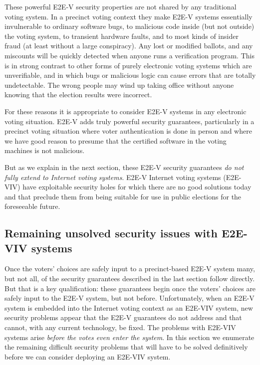 These powerful E2E-V security properties are not shared by any
traditional voting system. In a precinct voting context they make
E2E-V systems essentially invulnerable to ordinary software bugs, to
malicious code inside (but not outside) the voting system, to
transient hardware faults, and to most kinds of insider fraud (at
least without a large conspiracy). Any lost or modified ballots, and
any miscounts will be quickly detected when anyone runs a verification
program. This is in strong contrast to other forms of purely
electronic voting systems which are unverifiable, and in which bugs or
malicious logic can cause errors that are totally undetectable.  The
wrong people may wind up taking office without anyone knowing that the
election results were incorrect.

For these reasons it is appropriate to consider E2E-V systems in any
electronic voting situation. E2E-V adds truly powerful security
guarantees, particularly in a precinct voting situation where voter
authentication is done in person and where we have good reason to
presume that the certified software in the voting machines is not
malicious.

But as we explain in the next section, these E2E-V security guarantees
\emph{do not fully extend to Internet voting systems}. E2E-V Internet
voting systems (E2E-VIV) have exploitable security holes for which
there are no good solutions today and that preclude them from being
suitable for use in public elections for the foreseeable future.
  
\subsection{Remaining unsolved security issues with E2E-VIV systems}

Once the voters' choices are safely input to a precinct-based E2E-V
system many, but not all, of the security guarantees described in the
last section follow directly. But that is a key qualification: these
guarantees begin once the voters' choices are safely input to the
E2E-V system, but not before. Unfortunately, when an E2E-V system is
embedded into the Internet voting context as an E2E-VIV system, new
security problems appear that the E2E-V guarantees do not address and
that cannot, with any current technology, be fixed. The problems with
E2E-VIV systems arise \emph{before the votes even enter the
  system}. In this section we enumerate the remaining difficult
security problems that will have to be solved definitively before we
can consider deploying an E2E-VIV system.


